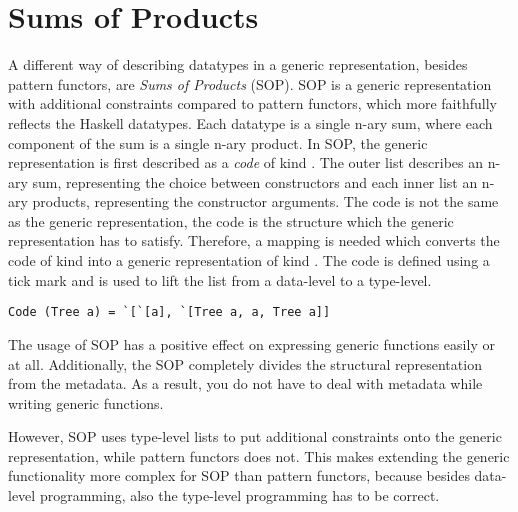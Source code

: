 \section{Sums of Products}
A different way of describing datatypes in a generic representation, besides pattern functors, are \textit{Sums of Products}\cite{vries2014sums} (SOP). SOP is a generic representation with additional constraints compared to pattern functors, which more faithfully reflects the Haskell datatypes. Each datatype is a single n-ary sum, where each component of the sum is a single n-ary product. In SOP, the generic representation is first described as a \textit{code} of kind \inlinehaskell{[[*]]}. The outer list describes an n-ary sum, representing the choice between constructors and each inner list an n-ary products, representing the constructor arguments. The code is not the same as the generic representation, the code is the structure which the generic representation has to satisfy. Therefore, a mapping is needed which converts the code of kind \inlinehaskell{[[*]]} into a generic representation of kind \inlinehaskell{*}. The code is defined using a tick mark  and is used to lift the list from a data-level to a type-level. 

\begin{verbatim}
Code (Tree a) = `[`[a], `[Tree a, a, Tree a]]
\end{verbatim}

The usage of SOP has a positive effect on expressing generic functions easily or at all. Additionally, the SOP completely divides the structural representation from the metadata. As a result, you do not have to deal with metadata while writing generic functions. 

However, SOP uses type-level lists to put additional constraints onto the generic representation, while pattern functors does not. This makes extending the generic functionality more complex for SOP than pattern functors, because besides data-level programming, also the type-level programming has to be correct.